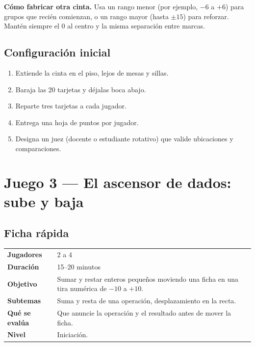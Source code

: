 \documentclass[12pt, letterpaper]{article}
\begin{document}
\begin{cuadroadvertencia}
\textbf{Cómo fabricar otra cinta.} Usa un rango menor (por ejemplo, $-6$ a $+6$) para grupos que recién comienzan, o un rango mayor (hasta $\pm15$) para reforzar. Mantén siempre el $0$ al centro y la misma separación entre marcas.
\end{cuadroadvertencia}

\subsection{Configuración inicial}

\begin{enumerate}[leftmargin=*]
  \item Extiende la cinta en el piso, lejos de mesas y sillas.
  \item Baraja las 20 tarjetas y déjalas boca abajo.
  \item Reparte tres tarjetas a cada jugador.
  \item Entrega una hoja de puntos por jugador.
  \item Designa un juez (docente o estudiante rotativo) que valide ubicaciones y comparaciones.
\end{enumerate}

\clearpage
\section{Juego 3 — El ascensor de dados: sube y baja}

\subsection{Ficha rápida}

\begin{center}
\small
\begin{tabular}{@{}p{3cm} p{12.2cm}@{}}
\toprule
\textbf{Jugadores} & 2 a 4\\
\textbf{Duración} & 15--20 minutos\\
\textbf{Objetivo} & Sumar y restar enteros pequeños moviendo una ficha en una tira numérica de $-10$ a $+10$.\\
\textbf{Subtemas} & Suma y resta de una operación, desplazamiento en la recta.\\
\textbf{Qué se evalúa} & Que anuncie la operación y el resultado antes de mover la ficha.\\
\textbf{Nivel} & Iniciación.\\
\bottomrule
\end{tabular}
\end{center}
\end{document}
